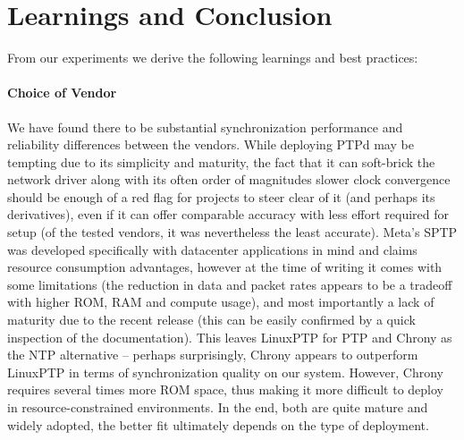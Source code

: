 \section{Learnings and Conclusion}
\label{sec:learnings_conclusion}
\label{sec:discussion}
\label{sec:learning}
From our experiments we derive the following learnings and best practices:

\paragraph{Choice of Vendor} We have found there to be substantial synchronization performance and reliability differences between the vendors. While deploying PTPd may be tempting due to its simplicity and maturity, the fact that it can soft-brick the network driver along with its often order of magnitudes slower clock convergence should be enough of a red flag for projects to steer clear of it (and perhaps its derivatives), even if it can offer comparable accuracy with less effort required for setup (of the tested vendors, it was nevertheless the least accurate). Meta's SPTP was developed specifically with datacenter applications in mind and claims resource consumption advantages, however at the time of writing it comes with some limitations (the reduction in data and packet rates appears to be a tradeoff with higher ROM, RAM and compute usage), and most importantly a lack of maturity due to the recent release (this can be easily confirmed by a quick inspection of the documentation). This leaves LinuxPTP for PTP and Chrony as the NTP alternative -- perhaps surprisingly, Chrony appears to outperform LinuxPTP in terms of synchronization quality on our system. However, Chrony requires several times more ROM space, thus making it more difficult to deploy in resource-constrained environments. In the end, both are quite mature and widely adopted, the better fit ultimately depends on the type of deployment.

